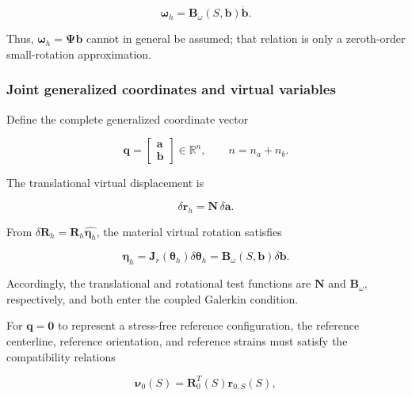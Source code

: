 \begin{equation}
\label{eq:galerkin-2-11}
\bm{\omega}_{h} = \mathbf{B}_{\omega}\left( S,\mathbf{b} \right)\dot{\mathbf{b}}.
\end{equation}

Thus, \(\bm{\omega}_{h} = \bm{\Psi}\dot{\mathbf{b}}\) cannot in general be assumed; that relation is only a zeroth-order small-rotation approximation.

\subsubsection{Joint generalized coordinates and virtual variables}\label{sec:galerkin-2-2-4}

Define the complete generalized coordinate vector

\begin{equation}
\label{eq:galerkin-2-12}
\mathbf{q} = \begin{bmatrix}
\mathbf{a} \\
\mathbf{b}
\end{bmatrix} \in \mathbb{R}^{n},\quad\quad n = n_{a} + n_{b}.
\end{equation}

The translational virtual displacement is

\begin{equation}
\label{eq:galerkin-2-13}
\delta\mathbf{r}_{h} = \mathbf{N}\,\delta\mathbf{a}.
\end{equation}

From \(\delta\mathbf{R}_{h} = \mathbf{R}_{h}\widehat{\bm{\eta}_{h}}\), the material virtual rotation satisfies

\begin{equation}
\label{eq:galerkin-2-14}
\bm{\eta}_{h} = \mathbf{J}_{r}\left( \bm{\theta}_{h} \right)\delta\bm{\theta}_{h} = \mathbf{B}_{\omega}\left( S,\mathbf{b} \right)\delta\mathbf{b}.
\end{equation}

Accordingly, the translational and rotational test functions are \(\mathbf{N}\) and \(\mathbf{B}_{\omega}\), respectively, and both enter the coupled Galerkin condition.

For \(\mathbf{q} = \mathbf{0}\) to represent a stress-free reference configuration, the reference centerline, reference orientation, and reference strains must satisfy the compatibility relations

\begin{equation}
\label{eq:galerkin-2-15}
\bm{\nu}_{0}(S) = \mathbf{R}_{0}^{T}(S)\mathbf{r}_{0,S}(S),
\end{equation}

